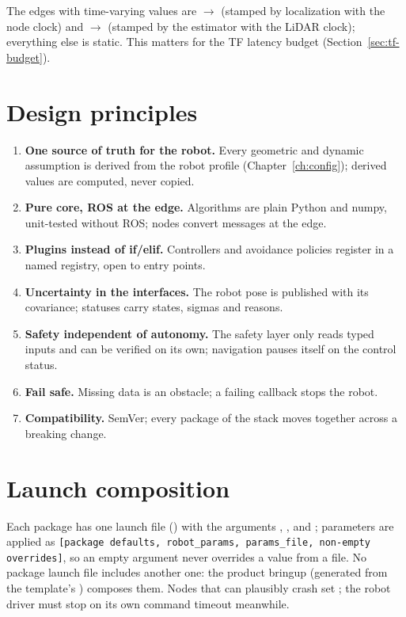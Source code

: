 The edges with time-varying values are $\to$ (stamped by localization with
the node clock) and $\to$ (stamped by the estimator with the LiDAR
clock); everything else is static. This matters for the TF latency budget
(Section~\ref{sec:tf-budget}).

\section{Design principles}

\begin{enumerate}
  \item \textbf{One source of truth for the robot.} Every geometric and dynamic assumption is
    derived from the robot profile (Chapter~\ref{ch:config}); derived values are computed,
    never copied.
  \item \textbf{Pure core, ROS at the edge.} Algorithms are plain Python and numpy, unit-tested
    without ROS; nodes convert messages at the edge.
  \item \textbf{Plugins instead of if/elif.} Controllers and avoidance policies register in a
    named registry, open to entry points.
  \item \textbf{Uncertainty in the interfaces.} The robot pose is published with its
    covariance; statuses carry states, sigmas and reasons.
  \item \textbf{Safety independent of autonomy.} The safety layer only reads typed inputs and
    can be verified on its own; navigation pauses itself on the control status.
  \item \textbf{Fail safe.} Missing data is an obstacle; a failing callback stops the robot.
  \item \textbf{Compatibility.} SemVer; every package of the stack moves together across a
    breaking change.
\end{enumerate}

\section{Launch composition}

Each package has one launch file () with the arguments
, ,  and ; parameters
are applied as \texttt{[package defaults, robot\_params, params\_file, non-empty overrides]}, so an
empty argument never overrides a value from a file. No package launch file includes another
one: the product bringup (generated from the template's ) composes them.
Nodes that can plausibly crash set ; the robot driver must stop on its own
command timeout meanwhile.
